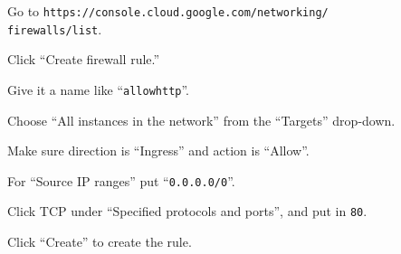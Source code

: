 \begin{compactenum}

\item Go to \texttt{https://console.cloud.google.com/networking/}\\\texttt{firewalls/list}.
\item Click ``Create firewall rule.''
\item Give it a name like ``\texttt{allowhttp}''.
\item Choose ``All instances in the network'' from the ``Targets'' drop-down.
\item Make sure direction is ``Ingress'' and action is ``Allow''.
\item For ``Source IP ranges'' put ``\texttt{0.0.0.0/0}''.
\item Click TCP under ``Specified protocols and ports'', and put in \texttt{80}.
\item Click ``Create'' to create the rule.
\end{compactenum}



